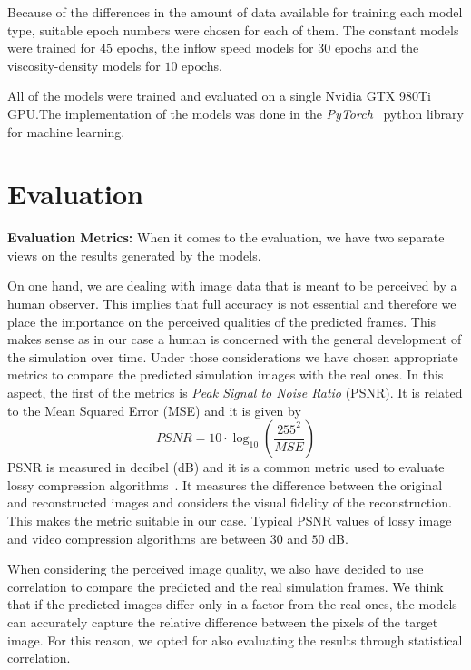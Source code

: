 \documentclass{llncs}
\begin{document}
Because of the differences in the amount of data available for training each model type, suitable epoch numbers were chosen for each of them. The constant models were trained for $45$ epochs, the inflow speed models for $30$ epochs and the viscosity-density models for $10$ epochs.

All of the models were trained and evaluated on a single Nvidia GTX 980Ti GPU.\@ The implementation of the models was done in the \emph{PyTorch}~\cite{paszke2017automatic} python library for machine learning.

\section{Evaluation}\label{eval}
\noindent\textbf{Evaluation Metrics:} When it comes to the evaluation, we have two separate views on the results generated by the models.

On one hand, we are dealing with image data that is meant to be perceived by a human observer. This implies that full accuracy is not essential and therefore we place the importance on the perceived qualities of the predicted frames. This makes sense as in our case a human is concerned with the general development of the simulation over time. Under those considerations we have chosen appropriate metrics to compare the predicted simulation images with the real ones. In this aspect, the first of the metrics is \emph{Peak Signal to Noise Ratio} (PSNR). It is related to the Mean Squared Error (MSE) and it is given by
\begin{equation}
PSNR = 10 \cdot \log_{10}\left(\frac{255^2}{MSE}\right)
\end{equation}
PSNR is measured in decibel (dB) and it is a common metric used to evaluate lossy compression algorithms~\cite{psnr1,psnr2}. It measures the difference between the original and reconstructed images and considers the visual fidelity of the reconstruction. This makes the metric suitable in our case. Typical PSNR values of lossy image and video compression algorithms are between $30$ and $50$ dB.

When considering the perceived image quality, we also have decided to use correlation to compare the predicted and the real simulation frames. We think that if the predicted images differ only in a factor from the real ones, the models can accurately capture the relative difference between the pixels of the target image. For this reason, we opted for also evaluating the results through statistical correlation.
\end{document}
